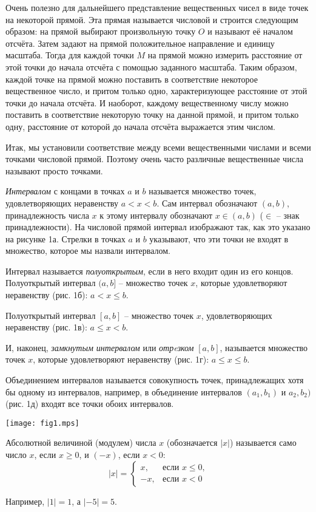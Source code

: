 Очень полезно для дальнейшего представление вещественных чисел в виде точек на
некоторой прямой. Эта прямая называется числовой и строится следующим образом:
на прямой выбирают произвольную точку $O$ и называют её началом отсчёта. Затем
задают на прямой положительное направление и единицу масштаба. Тогда для каждой
точки $M$ на прямой можно измерить расстояние от этой точки до начала отсчёта с
помощью заданного масштаба. Таким образом, каждой точке на прямой можно
поставить в соответствие некоторое вещественное число, и притом только одно,
характеризующее расстояние от этой точки до начала отсчёта. И наоборот, каждому
вещественному числу можно поставить в соответствие некоторую точку на данной
прямой, и притом только одну, расстояние от которой до начала отсчёта
выражается этим числом.

Итак, мы установили соответствие между всеми вещественными числами и всеми
точками числовой прямой. Поэтому очень часто различные вещественные числа
называют просто точками.

\textit{Интервалом} с концами в точках $a$ и $b$ называется множество точек,
удовлетворяющих неравенству $a < x < b$. Сам интервал обозначают $(a, b)$,
принадлежность числа $x$ к этому интервалу обозначают $x \in (a, b)$ ($\in$ --
знак принадлежности). На числовой прямой интервал изображают так, как это
указано на рисунке 1а. Стрелки в точках $a$ и $b$ указывают, что эти точки не
входят в множество, которое мы назвали интервалом.

Интервал называется \textit{полуоткрытым}, если в него входит один из его
концов. Полуоткрытый интервал $(a, b]$ -- множество точек $x$, которые
удовлетворяют неравенству (рис. 1б): $a < x \leq b$.

Полуоткрытый интервал $[a, b]$ -- множество точек $x$, удовлетворяющих
неравенству (рис. 1в): $a \leq x < b$.

И, наконец, \textit{замкнутым интервалом} или \textit{отрeзком} $[a, b]$,
называется множество точек $x$, которые удовлетворяют неравенству (рис. 1г): $a
\leq x \leq b$.

Объединением интервалов называется совокупность точек, принадлежащих хотя бы
одному из интервалов, например, в объединение интервалов $(a_1, b_1)$ и $a_2,
b_2)$ (рис. 1д) входят все точки обоих интервалов.

\texttt{[image: fig1.mps]}

\begin{definition}
	Абсолютной величиной (модулем) числа $x$ (обозначается $|x|$)
	называется само число $x$, если $x \geq 0$, и $(-x)$, если $x < 0$:
	$$|x| = \begin{cases}
		x, &\text{если $x \leq 0$,}\\
		-x, &\text{если $x < 0$}
	\end{cases}$$
\end{definition}
Например, $|1| = 1$, а $|-5| = 5$.

